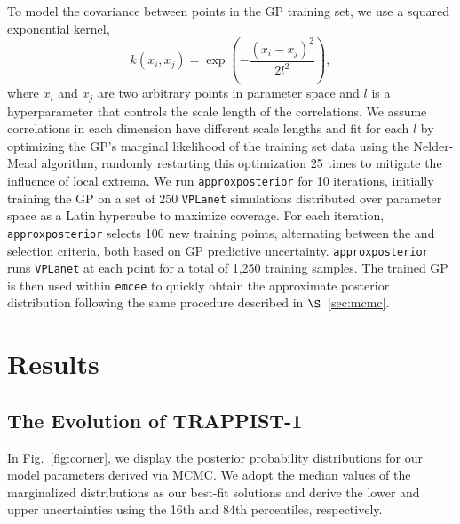 \documentclass[twocolumn]{aastex62}
\newcommand{\vplanet}[0]{\texttt{VPLanet}\xspace}
\newcommand{\emcee}[0]{\texttt{emcee}\xspace}
\newcommand{\approxposterior}[0]{\texttt{approxposterior}\xspace}
\begin{document}
To model the covariance between points in the GP training set, we use a squared exponential kernel,
\begin{equation} \label{eqn:kernel}
k(x_i, x_j) = \exp \left( - \frac{(x_i - x_j)^2}{2l^2} \right),
\end{equation}
where $x_i$ and $x_j$ are two arbitrary points in parameter space and $l$ is a hyperparameter that controls the scale length of the correlations. We assume correlations in each dimension have different scale lengths and fit for each $l$ by optimizing the GP's marginal likelihood of the training set data using the Nelder-Mead algorithm, randomly restarting this optimization 25 times to mitigate the influence of local extrema. We run \approxposterior for 10 iterations, initially training the GP on a set of 250 \vplanet simulations distributed over parameter space as a Latin hypercube to maximize coverage. For each iteration, \approxposterior selects 100 new training points, alternating between the \citet{Kandasamy2015} and \citet{Wang2017} selection criteria, both based on GP predictive uncertainty. \approxposterior runs \vplanet at each point for a total of 1,250 training samples. The trained GP is then used within \emcee to quickly obtain the approximate posterior distribution following the same procedure described in $\S$~\ref{sec:mcmc}.


\section{Results} \label{sec:results}

\subsection{The Evolution of TRAPPIST-1}

In Fig.~\ref{fig:corner}, we display the posterior probability distributions for our model parameters derived via MCMC. We adopt the median values of the marginalized distributions as our best-fit solutions and derive the lower and upper uncertainties using the 16th and 84th percentiles, respectively. 
\end{document}
